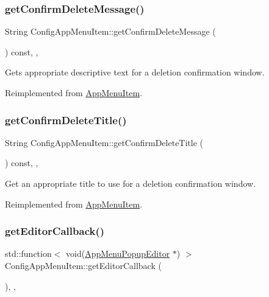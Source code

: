 \subsubsection{\texorpdfstring{get\+Confirm\+Delete\+Message()}{getConfirmDeleteMessage()}}
{\footnotesize\ttfamily String Config\+App\+Menu\+Item\+::get\+Confirm\+Delete\+Message (\begin{DoxyParamCaption}{ }\end{DoxyParamCaption}) const\hspace{0.3cm}{\ttfamily [override]}, {\ttfamily [protected]}, {\ttfamily [virtual]}}

Gets appropriate descriptive text for a deletion confirmation window. 

Reimplemented from \mbox{\hyperlink{classAppMenuItem_ac5922f3ac33054ecd54bb3fab692d639}{App\+Menu\+Item}}.

\mbox{\label{classConfigAppMenuItem_a7fa58af5cacd6c4dbd891a959efe1c07}} 
\subsubsection{\texorpdfstring{get\+Confirm\+Delete\+Title()}{getConfirmDeleteTitle()}}
{\footnotesize\ttfamily String Config\+App\+Menu\+Item\+::get\+Confirm\+Delete\+Title (\begin{DoxyParamCaption}{ }\end{DoxyParamCaption}) const\hspace{0.3cm}{\ttfamily [override]}, {\ttfamily [protected]}, {\ttfamily [virtual]}}

Get an appropriate title to use for a deletion confirmation window. 

Reimplemented from \mbox{\hyperlink{classAppMenuItem_a93bd0cf3b4e28d09a4975023b383c1dc}{App\+Menu\+Item}}.

\mbox{\label{classConfigAppMenuItem_a82c1db45a09f0997b9f8802a3729972a}} 
\subsubsection{\texorpdfstring{get\+Editor\+Callback()}{getEditorCallback()}}
{\footnotesize\ttfamily std\+::function$<$ void(\mbox{\hyperlink{classAppMenuPopupEditor}{App\+Menu\+Popup\+Editor}} $\ast$) $>$ Config\+App\+Menu\+Item\+::get\+Editor\+Callback (\begin{DoxyParamCaption}{ }\end{DoxyParamCaption})\hspace{0.3cm}{\ttfamily [override]}, {\ttfamily [protected]}, {\ttfamily [virtual]}}

